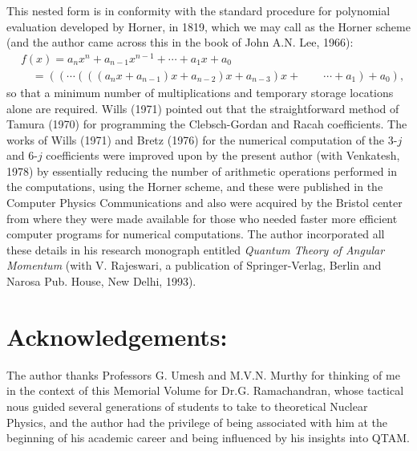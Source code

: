 This nested form is in conformity with the standard procedure for polynomial evaluation 
developed by Horner, in 1819, which we may call as the Horner scheme (and the author 
came across this in the book of John A.N. Lee, 1966):
\begin{equation}
\begin{split}
& f(x) = a_nx^n + a_{n-1}x^{n-1} + \cdots + a_1x + a_0 \\
& \quad = ((\cdots (((a_nx+ a_{n-1})x + a_{n-2})x + a_{n-3})x + \qquad \cdots + a_1) + a_0), \label{chap29-eq61}
\end{split}
\end{equation}
so that a minimum number of multiplications and temporary storage locations alone 
are required. Wills (1971) pointed out that the straightforward method of Tamura (1970) 
for programming the Clebsch-Gordan and Racah coefficients. The works of Wills (1971) and 
Bretz (1976) for the numerical computation of the 3-$j$ and 6-$j$ coefficients were
improved upon by the present author (with Venkatesh, 1978) by essentially reducing the 
number of arithmetic operations performed in the computations, using the Horner scheme,
and these were published in the Computer Physics Communications and also were acquired
by the Bristol center from where they were made available for those who needed faster
more efficient computer programs for numerical computations. The author incorporated 
all these details in his research monograph entitled \textit{Quantum Theory of Angular
Momentum} (with V. Rajeswari, a publication of Springer-Verlag, Berlin and Narosa Pub. 
House, New Delhi, 1993).

\section*{Acknowledgements:}

The author thanks Professors G. Umesh and M.V.N. Murthy 
for thinking of me in the context of this Memorial Volume for Dr.G. Ramachandran, 
whose tactical nous guided several generations of students to take to theoretical 
Nuclear Physics, and the author had the privilege of being associated with him at 
the beginning of his academic career and being influenced by his insights into QTAM.

